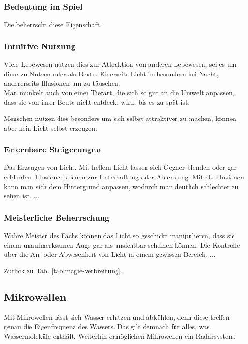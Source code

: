 \subsubsection{Bedeutung im Spiel}
Die  beherrscht diese Eigenschaft. 

\subsubsection{Intuitive Nutzung}
Viele Lebewesen nutzen dies zur Attraktion von anderen Lebewesen, sei es um diese zu Nutzen oder als Beute. Einerseits Licht insbesondere bei Nacht, andererseits Illusionen um zu täuschen. \\
Man munkelt auch von einer Tierart, die sich so gut an die Umwelt anpassen, dass sie von ihrer Beute nicht entdeckt wird, bis es zu spät ist. 

Menschen nutzen dies besonders um sich selbst attraktiver zu machen, können aber kein Licht selbst erzeugen.

\subsubsection{Erlernbare Steigerungen}
\begin{outline}
	\1 Das Erzeugen von Licht.
	\1 Mit hellem Licht lassen sich Gegner blenden oder gar erblinden.
	\1 Illusionen dienen zur Unterhaltung oder Ablenkung.
	\1 Mittels Illusionen kann man sich dem Hintergrund anpassen, wodurch man deutlich schlechter zu sehen ist.
	\1 ...
\end{outline}

\subsubsection{Meisterliche Beherrschung} 
\begin{outline}
	\1 Wahre Meister des Fachs können das Licht so geschickt manipulieren, dass sie einem unaufmerksamen Auge gar als unsichtbar scheinen können.
	\1 Die Kontrolle über die An- oder Abwesenheit von Licht in einem gewissen Bereich.
	\1 ...
\end{outline}
Zurück zu Tab. \ref{tab:magie-verbreitung}.



\subsection{Mikrowellen}\label{sec:mikrowellenmagie}
Mit Mikrowellen lässt sich Wasser erhitzen und abkühlen, denn diese treffen genau die Eigenfrequenz des Wassers.
Das gilt demnach für alles, was Wassermoleküle enthält.
Weiterhin ermöglichen Mikrowellen ein Radarsystem.


